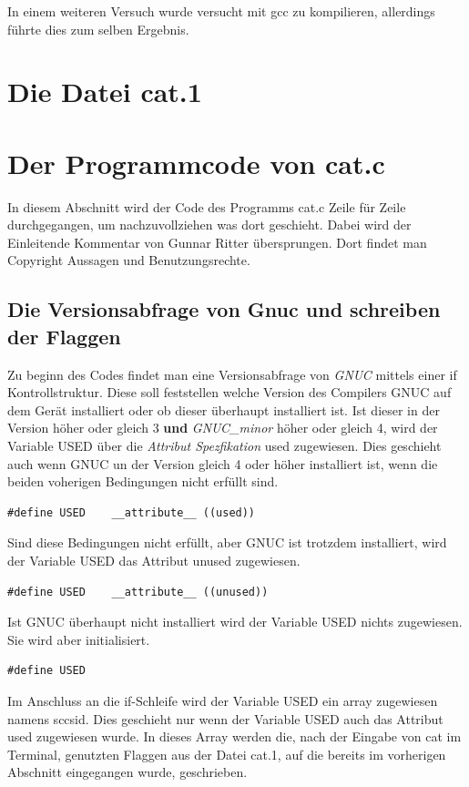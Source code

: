 In einem weiteren Versuch wurde versucht mit gcc zu kompilieren, allerdings führte dies zum selben Ergebnis.

\section{Die Datei cat.1}



\section{Der Programmcode von cat.c}
In diesem Abschnitt wird der Code des Programms cat.c Zeile für Zeile durchgegangen, um nachzuvollziehen was dort geschieht. Dabei wird der Einleitende Kommentar von Gunnar Ritter übersprungen. Dort findet man Copyright Aussagen und Benutzungsrechte.

\subsection{Die Versionsabfrage von Gnuc und schreiben der Flaggen}
Zu beginn des Codes findet man eine Versionsabfrage von \textit{GNUC} mittels einer if Kontrollstruktur. Diese soll feststellen welche Version des Compilers GNUC auf dem Gerät installiert oder ob dieser überhaupt installiert ist. Ist dieser in der Version höher oder gleich 3 \textbf{und} \textit{GNUC\_minor} höher oder gleich 4, wird der Variable USED über die \textit{Attribut Spezfikation} used zugewiesen. Dies geschieht auch wenn GNUC un der Version gleich 4 oder höher installiert ist, wenn die beiden voherigen Bedingungen nicht erfüllt sind.

\begin{lstlisting}
#define USED	__attribute__ ((used))
\end{lstlisting}

Sind diese Bedingungen nicht erfüllt, aber GNUC ist trotzdem installiert, wird der Variable USED das Attribut unused zugewiesen.

\begin{lstlisting}
#define USED	__attribute__ ((unused))
\end{lstlisting}

Ist GNUC überhaupt nicht installiert wird der Variable USED nichts zugewiesen. Sie wird aber initialisiert.

\begin{lstlisting}
#define USED
\end{lstlisting}

Im Anschluss an die if-Schleife wird der Variable USED ein array zugewiesen namens sccsid. Dies geschieht nur wenn der Variable USED auch das Attribut used zugewiesen wurde. In dieses Array werden die, nach der Eingabe von cat im Terminal, genutzten Flaggen aus der Datei cat.1, auf die bereits im vorherigen Abschnitt eingegangen wurde, geschrieben.
